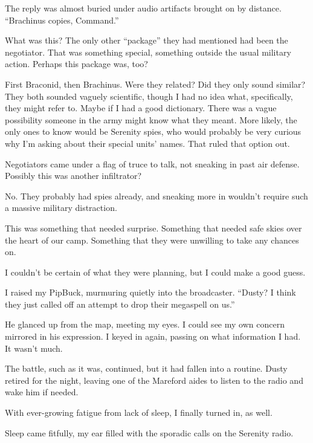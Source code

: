The reply was almost buried under audio artifacts brought on by distance. “Brachinus copies, Command.”

What was this? The only other “package” they had mentioned had been the negotiator. That was something special, something outside the usual military action. Perhaps this package was, too?

First Braconid, then Brachinus. Were they related? Did they only sound similar? They both sounded vaguely scientific, though I had no idea what, specifically, they might refer to. Maybe if I had a good dictionary. There was a vague possibility someone in the army might know what they meant. More likely, the only ones to know would be Serenity spies, who would probably be very curious why I’m asking about their special units’ names. That ruled that option out.

Negotiators came under a flag of truce to talk, not sneaking in past air defense. Possibly this was another infiltrator?

No. They probably had spies already, and sneaking more in wouldn’t require such a massive military distraction.

This was something that needed surprise. Something that needed safe skies over the heart of our camp. Something that they were unwilling to take any chances on.

I couldn’t be certain of what they were planning, but I could make a good guess.

I raised my PipBuck, murmuring quietly into the broadcaster. “Dusty? I think they just called off an attempt to drop their megaspell on us.”

He glanced up from the map, meeting my eyes. I could see my own concern mirrored in his expression. I keyed in again, passing on what information I had. It wasn’t much.

The battle, such as it was, continued, but it had fallen into a routine. Dusty retired for the night, leaving one of the Mareford aides to listen to the radio and wake him if needed.

With ever-growing fatigue from lack of sleep, I finally turned in, as well.

Sleep came fitfully, my ear filled with the sporadic calls on the Serenity radio.